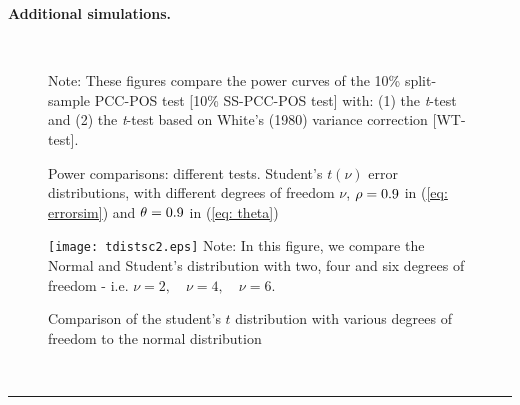 \documentclass[harvard,11pt]{article}
\newenvironment{proof}[1][Proof]{\textbf{#1.} }{\  \rule{0.5em}{0.5em}}
\begin{document}
\begin{proof}[Additional simulations]
\begin{figure}[tbph]
\caption{Power comparisons: different tests. Student's $t(\nu)$ error distributions, with
different degrees of freedom $\nu$, $\protect\rho=0.9$ in (\protect\ref{eq: errorsim}) and $\protect%
\theta =0.9$ in (\protect\ref{eq: theta})}
\begin{center}
 \\[0pt]
\end{center}
\doublespacing
Note: These figures compare the power curves of the 10\% split-sample PCC-POS test
[10\% SS-PCC-POS test] with: (1) the \textit{t}-test and (2) the \textit{t}-test based
on White's (1980) variance correction [WT-test]. 
\label{fig: c24}
\end{figure}
\FloatBarrier
\begin{figure}
\caption{Comparison of the student's $t$ distribution with various degrees of freedom to the normal distribution}
\texttt{[image: tdistsc2.eps]}\label{fig: distos1}
Note: In this figure, we compare the Normal and Student's distribution with two, four and six degrees of freedom - i.e. $\nu=2,\quad \nu=4,\quad \nu=6$.
\label{fig: c25}
\end{figure}
\FloatBarrier
\end{proof}
\newpage


\end{document}
